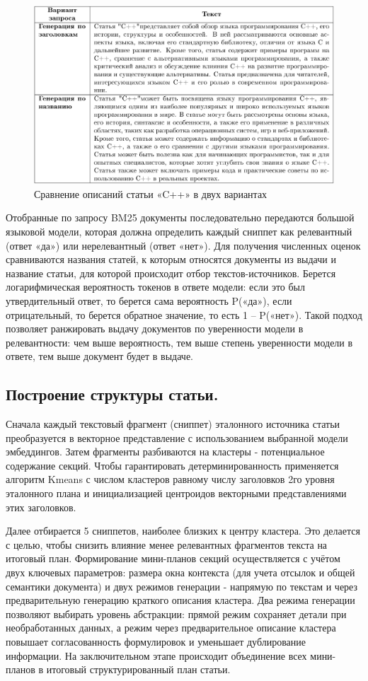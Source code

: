 \documentclass{article}
\begin{document}
\begin{figure}[ht!]
  \centering
  \includegraphics[width=\textwidth]{figures/two_queries.png}
  \caption{Сравнение описаний статьи «C++» в двух вариантах}
  \label{fig:c++}
\end{figure}

Отобранные по запросу BM25 документы последовательно передаются большой языковой модели, которая должна определить каждый сниппет как релевантный (ответ «да») или нерелевантный (ответ «нет»). 
Для получения численных оценок сравниваются названия статей, к которым относятся документы из выдачи и название статьи, для которой происходит отбор текстов-источников. 
Берется логарифмическая вероятность токенов в ответе модели: если это был утвердительный ответ, то берется сама вероятность P(«да»), если отрицательный, то берется обратное значение, то есть 1 – P(«нет»).
Такой подход позволяет ранжировать выдачу документов по уверенности модели в релевантности: чем выше вероятность, тем выше степень уверенности модели в ответе, тем выше документ будет в выдаче.

\subsection*{Построение структуры статьи.}
Сначала каждый текстовый фрагмент (сниппет) эталонного источника статьи преобразуется в векторное представление с использованием выбранной модели эмбеддингов. 
Затем фрагменты разбиваются на кластеры - потенциальное содержание секций. 
Чтобы гарантировать детерминированность применяется алгоритм Kmeans с числом кластеров равному числу заголовков 2го уровня эталонного плана и инициализацией центроидов векторными представлениями этих заголовков. 

Далее отбирается 5 сниппетов, наиболее близких к центру кластера. Это делается с целью, чтобы снизить влияние менее релевантных фрагментов текста на итоговый план. 
Формирование мини-планов секций осуществляется с учётом двух ключевых параметров: 
размера окна контекста (для учета отсылок и общей семантики документа) и двух режимов генерации - напрямую по текстам и через предварительную генерацию краткого описания кластера.
Два режима генерации позволяют выбирать уровень абстракции: 
прямой режим сохраняет детали при необработанных данных, а режим через предварительное описание кластера
повышает согласованность формулировок и уменьшает дублирование информации.
На заключительном этапе происходит объединение всех мини-планов в итоговый структурированный план статьи.
\end{document}
